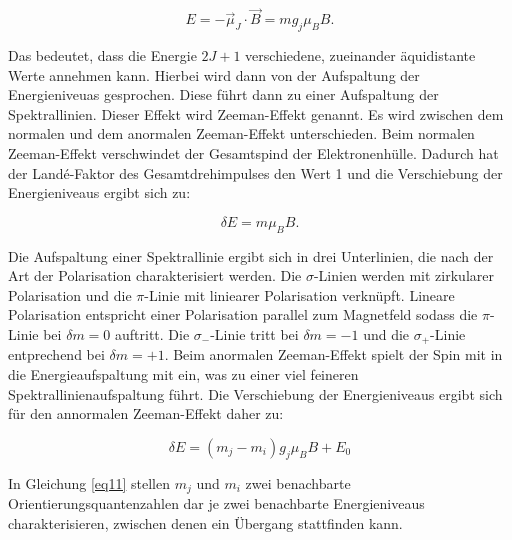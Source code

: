 \begin{equation}
    E = - \vec{\mu}_J \cdot \vec{B} = m g_j \mu_B B.
    \label{eq9}
\end{equation}

Das bedeutet, dass die Energie $2J+1$ verschiedene, zueinander 
äquidistante Werte annehmen kann. 
Hierbei wird dann von der Aufspaltung der Energieniveuas gesprochen. 
Diese führt dann zu einer Aufspaltung der Spektrallinien.
Dieser Effekt wird Zeeman-Effekt genannt.
Es wird zwischen dem normalen und dem anormalen Zeeman-Effekt unterschieden.
Beim normalen Zeeman-Effekt verschwindet der Gesamtspind der Elektronenhülle.
Dadurch hat der Landé-Faktor des Gesamtdrehimpulses den Wert 1 und 
die Verschiebung der Energieniveaus ergibt sich zu:

\begin{equation}
    \delta E = m \mu_B B.
    \label{eq10}
\end{equation}

Die Aufspaltung einer Spektrallinie ergibt sich in drei Unterlinien,
die nach der Art der Polarisation charakterisiert werden. 
Die $\sigma$-Linien werden mit zirkularer Polarisation und die $\pi$-Linie 
mit liniearer Polarisation verknüpft. Lineare Polarisation entspricht einer Polarisation
parallel zum Magnetfeld sodass die $\pi$-Linie bei $\delta m = 0$ auftritt.
Die $\sigma_-$-Linie tritt bei $\delta m = -1$ und die $\sigma_+$-Linie entprechend 
bei $\delta m = +1$.
Beim anormalen Zeeman-Effekt spielt der Spin mit in die Energieaufspaltung mit 
ein, was zu einer viel feineren Spektrallinienaufspaltung führt. 
Die Verschiebung der Energieniveaus ergibt sich für den annormalen Zeeman-Effekt 
daher zu:

\begin{equation}
    \delta E = (m_j -m_i)g_j \mu_B B + E_0
    \label{eq11}
\end{equation}

In Gleichung \eqref{eq11} stellen $m_j$ und $m_i$ zwei benachbarte Orientierungsquantenzahlen
dar je zwei benachbarte Energieniveaus charakterisieren, zwischen denen ein Übergang 
stattfinden kann.